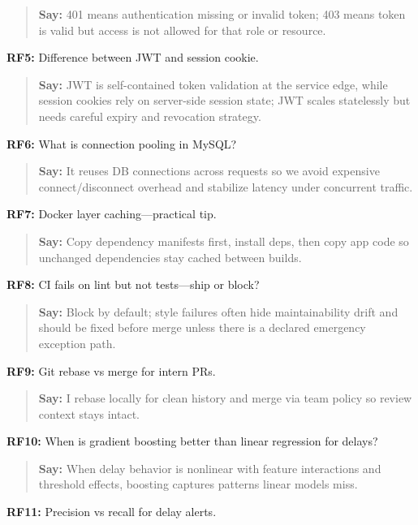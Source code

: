 \documentclass[9pt,a4paper]{article}
\begin{document}
\begin{quote}\small\textbf{Say:} 401 means authentication missing or invalid token; 403 means token is valid but access is not allowed for that role or resource.\end{quote}
\vspace{2mm}
\textbf{RF5:} Difference between JWT and session cookie.

\begin{quote}\small\textbf{Say:} JWT is self-contained token validation at the service edge, while session cookies rely on server-side session state; JWT scales statelessly but needs careful expiry and revocation strategy.\end{quote}
\vspace{2mm}
\textbf{RF6:} What is connection pooling in MySQL?

\begin{quote}\small\textbf{Say:} It reuses DB connections across requests so we avoid expensive connect/disconnect overhead and stabilize latency under concurrent traffic.\end{quote}
\vspace{2mm}
\textbf{RF7:} Docker layer caching---practical tip.

\begin{quote}\small\textbf{Say:} Copy dependency manifests first, install deps, then copy app code so unchanged dependencies stay cached between builds.\end{quote}
\vspace{2mm}
\textbf{RF8:} CI fails on lint but not tests---ship or block?

\begin{quote}\small\textbf{Say:} Block by default; style failures often hide maintainability drift and should be fixed before merge unless there is a declared emergency exception path.\end{quote}
\vspace{2mm}
\textbf{RF9:} Git rebase vs merge for intern PRs.

\begin{quote}\small\textbf{Say:} I rebase locally for clean history and merge via team policy so review context stays intact.\end{quote}
\vspace{2mm}
\textbf{RF10:} When is gradient boosting better than linear regression for delays?

\begin{quote}\small\textbf{Say:} When delay behavior is nonlinear with feature interactions and threshold effects, boosting captures patterns linear models miss.\end{quote}
\vspace{2mm}
\textbf{RF11:} Precision vs recall for delay alerts.
\end{document}
